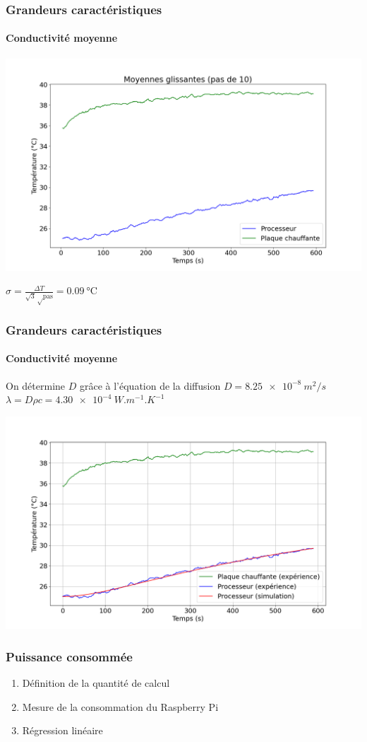 \documentclass[a4paper,11pt]{beamer}
\newcommand{\cel}{\degreeCelsius}
\begin{document}
\begin{frame}
    \frametitle{Grandeurs caractéristiques}
    \framesubtitle{Conductivité moyenne}
    \includegraphics[width=\textwidth]{moyennes_glissantes.png}
    \begin{center}
        $\sigma = \frac{\Delta T}{\sqrt 3 \sqrt \text{pas}} = \SI{0,09}{\cel}$
    \end{center}
\end{frame}


\begin{frame}
    \frametitle{Grandeurs caractéristiques}
    \framesubtitle{Conductivité moyenne}
    On détermine $D$ grâce à l'équation de la diffusion
    $D = \SI{8.25e-8}{m^2/s}$ \hfill
    $\lambda = D \rho c = \SI{4.30e-4}{W.m^{-1}.K^{-1}}$

    \includegraphics[width=\textwidth]{d_simulation.png}
\end{frame}

\begin{frame}
    \frametitle{Puissance consommée}

    \begin{enumerate}
        \item Définition de la quantité de calcul
        \item Mesure de la consommation du Raspberry Pi
        \item Régression linéaire
    \end{enumerate}
\end{frame}
\end{document}
